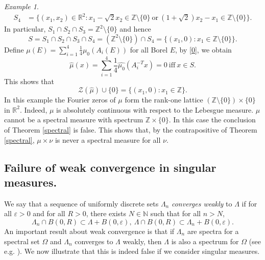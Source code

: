 \documentclass[reqno,a4paper,12pt]{amsart}
\numberwithin{equation}{section}
\newcommand{\R}{{\mathbb R}}
\newcommand{\Z}{{\mathbb Z}}
\newcommand{\N}{{\mathbb N}}
\newcommand{\D}{{\mathcal D}}
\newcounter{rem}
\theoremstyle{remark}
\newtheorem{example}{Example}[section]
\numberwithin{equation}{section}
\def\N{\mathbb{N}}
\def\Z{\mathbb{Z}}
\def\R{\mathbb{R}}
\begin{document}
{\begin{example}
\begin{align}
S_4&=\{(x_1,x_2)\in \mathbb{R}^2:x_1-\sqrt{2}x_2\in \mathbb{Z}\setminus\{0\} \ \text{or}\ (1+\sqrt{2})x_2-x_1\in \mathbb{Z}\setminus\{0\}\}.\nonumber
\end{align}
In particular, $S_1\cap S_2\cap S_3 = \Z^2\setminus\{0\}$ and hence
\[S=S_1\cap S_2\cap S_3\cap S_4=(\mathbb{Z}^2\setminus\{0\})\cap S_4=\{(x_1,0):x_1\in \mathbb{Z}\setminus\{0\}\}.\]
Define $\mu(E)=\sum_{i=1}^{4}\frac{1}{4}\mu_0(A_i(E))$ for all Borel $E$,  
by \eqref{0}, we obtain
\[\widehat{\mu}(x)=\sum_{i=1}^{4}\frac{1}{4}\widehat{\mu_0}(A_i^{-T}x)=0 \ \text{iff} \ x\in S.\]
This shows that
\[\mathcal{Z}(\widehat{\mu})\cup\{0\}=\{(x_1,0):x_1\in \mathbb{Z}\}.\]
In this example the Fourier zeros of $\mu$ form the rank-one lattice $(\Z\setminus\{0\})\times \{0\}$ in $\R^2$. Indeed, $\mu$ is absolutely continuous with respect to the Lebesgue measure. $\mu$ cannot be a spectral measure with spectrum $\Z\times \{0\}$. In this case the conclusion of Theorem \ref{spectral} is false. This shows that, by the contrapositive of Theorem \ref{spectral}, $\mu\times \nu$ is never a spectral measure for all $\nu$.
\end{example}



\subsection{Failure of weak convergence in singular measures.} \label{3.1} We say that a sequence of uniformly discrete sets $\Lambda_n$ {\it converges weakly} to $\Lambda$ if for all  $\varepsilon>0$ and for all $R>0$, there exists $N\in\N$ such that for all $n>N$, 
$$
\Lambda_n\cap B(0,R)\subset \Lambda+B(0,\varepsilon), \ \Lambda\cap B(0,R)\subset \Lambda_n+B(0,\varepsilon).
$$
An important result about weak convergence is that if $\Lambda_n$ are spectra for a spectral set $\Omega$ and $\Lambda_n$ converges to $\Lambda$ weakly, then $\Lambda$ is also a spectrum for $\Omega$ (see e.g. \cite[Lemma 3.1]{GL-JFA}). We now illustrate that this is indeed false if we consider singular measures. 

}
\end{document}
